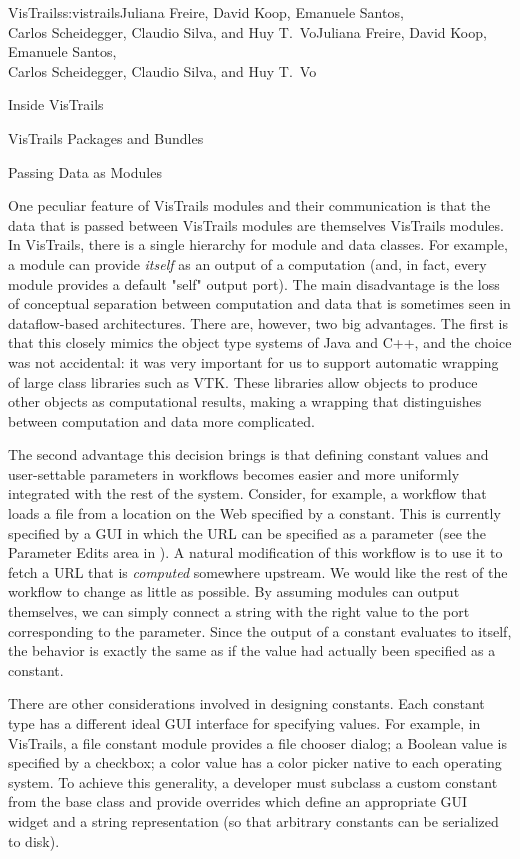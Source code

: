 \begin{aosachaptertoc}{VisTrails}{s:vistrails}{Juliana Freire, David Koop, Emanuele Santos, \\ Carlos Scheidegger, Claudio Silva, and Huy T.\ Vo}{Juliana Freire, David Koop, Emanuele Santos, \\ \hspace*{0.9cm} Carlos Scheidegger, Claudio Silva, and Huy T.\ Vo}
\begin{aosasect1}{Inside VisTrails}
\begin{aosasect2}{VisTrails Packages and Bundles}
\end{aosasect2}

\begin{aosasect2}{Passing Data as Modules}

One peculiar feature of VisTrails modules and their communication is
that the data that is passed between VisTrails modules are themselves
VisTrails modules. In VisTrails, there is a single hierarchy for
module and data classes. For example, a module can provide
\emph{itself} as an output of a computation (and, in fact, every
module provides a default "self" output port). The main disadvantage
is the loss of conceptual separation between computation and data that
is sometimes seen in dataflow-based architectures. There are, however,
two big advantages.  The first is that this closely mimics the object
type systems of Java and C++, and the choice was not accidental: it
was very important for us to support automatic wrapping of large class
libraries such as VTK.  These libraries allow objects to produce
other objects as computational results, making a wrapping that
distinguishes between computation and data more complicated.

The second advantage this decision brings is that defining constant
values and user-settable parameters in workflows becomes easier and
more uniformly integrated with the rest of the system. Consider, for
example, a workflow that loads a file from a location on the Web
specified by a constant. This is currently specified by a GUI in which
the URL can be specified as a parameter (see the Parameter Edits area
in ). A natural modification of
this workflow is to use it to fetch a URL that is \emph{computed}
somewhere upstream. We would like the rest of the workflow to change
as little as possible. By assuming modules can output themselves, we
can simply connect a string with the right value to the port
corresponding to the parameter. Since the output of a constant
evaluates to itself, the behavior is exactly the same as if the value
had actually been specified as a constant.


There are other considerations involved in designing constants. 
Each constant type has a different ideal GUI interface for
specifying values. For example, in VisTrails, a file constant module
provides a file chooser dialog; a Boolean value is specified by a
checkbox; a color value has a color picker native to each operating
system.  To achieve this generality, a developer must subclass a
custom constant from the  base class and provide
overrides which define an appropriate GUI widget and a string
representation (so that arbitrary constants can be serialized to
disk).


\end{aosasect2}
\end{aosasect1}
\end{aosachaptertoc}
